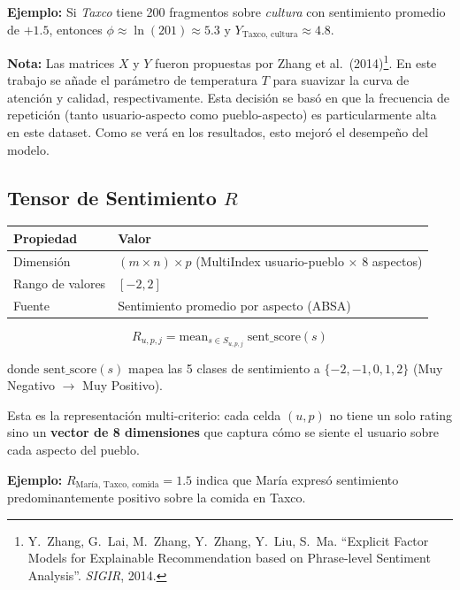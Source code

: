 \documentclass[11pt, a4paper]{article}
\begin{document}
\textbf{Ejemplo:} Si \textit{Taxco} tiene 200 fragmentos sobre \textit{cultura} con sentimiento promedio de $+1.5$, entonces $\phi \approx \ln(201) \approx 5.3$ y $Y_{\text{Taxco, cultura}} \approx 4.8$.

\textbf{Nota:} Las matrices $X$ y $Y$ fueron propuestas por Zhang et al.\ (2014)\footnote{Y.\ Zhang, G.\ Lai, M.\ Zhang, Y.\ Zhang, Y.\ Liu, S.\ Ma. ``Explicit Factor Models for Explainable Recommendation based on Phrase-level Sentiment Analysis''. \textit{SIGIR}, 2014.}. En este trabajo se añade el parámetro de temperatura $T$ para suavizar la curva de atención y calidad, respectivamente. Esta decisión se basó en que la frecuencia de repetición (tanto usuario-aspecto como pueblo-aspecto) es particularmente alta en este dataset. Como se verá en los resultados, esto mejoró el desempeño del modelo.

\subsection{Tensor de Sentimiento $R$}

\begin{table}[H]\centering
\begin{tabular}{ll}
\toprule
\textbf{Propiedad} & \textbf{Valor} \\
\midrule
Dimensión       & $(m \times n) \times p$ (MultiIndex usuario-pueblo $\times$ 8 aspectos) \\
Rango de valores & $[-2, 2]$ \\
Fuente          & Sentimiento promedio por aspecto (ABSA) \\
\bottomrule
\end{tabular}
\end{table}

\begin{equation}
    R_{u,p,j} = \text{mean}_{s \in S_{u,p,j}} \; \text{sent\_score}(s)
\end{equation}

donde $\text{sent\_score}(s)$ mapea las 5 clases de sentimiento a $\{-2, -1, 0, 1, 2\}$ (Muy Negativo $\to$ Muy Positivo).

Esta es la representación multi-criterio: cada celda $(u, p)$ no tiene un solo rating sino un \textbf{vector de 8 dimensiones} que captura cómo se siente el usuario sobre cada aspecto del pueblo.

\textbf{Ejemplo:} $R_{\text{María, Taxco, comida}} = 1.5$ indica que María expresó sentimiento predominantemente positivo sobre la comida en Taxco.
\end{document}
